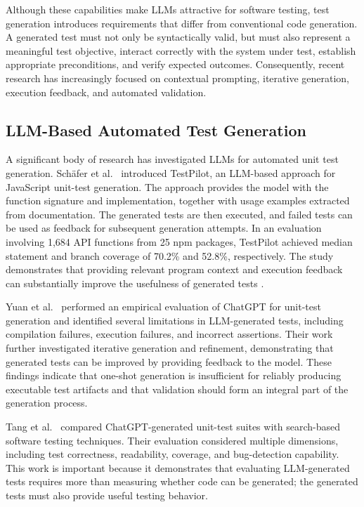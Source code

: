 \documentclass[pdflatex,sn-mathphys-num]{sn-jnl}
\begin{document}
Although these capabilities make LLMs attractive for software testing,
test generation introduces requirements that differ from conventional code
generation. A generated test must not only be syntactically valid, but
must also represent a meaningful test objective, interact correctly with
the system under test, establish appropriate preconditions, and verify
expected outcomes. Consequently, recent research has increasingly focused
on contextual prompting, iterative generation, execution feedback, and
automated validation.

\subsection{LLM-Based Automated Test Generation}
\label{subsec:llm-test-generation}

A significant body of research has investigated LLMs for automated unit
test generation. Schäfer et al.~\cite{schafer2024testpilot} introduced
TestPilot, an LLM-based approach for JavaScript unit-test generation. The
approach provides the model with the function signature and implementation,
together with usage examples extracted from documentation. The generated
tests are then executed, and failed tests can be used as feedback for
subsequent generation attempts. In an evaluation involving 1,684 API
functions from 25 npm packages, TestPilot achieved median statement and
branch coverage of 70.2\% and 52.8\%, respectively. The study demonstrates
that providing relevant program context and execution feedback can
substantially improve the usefulness of generated tests
\cite{schafer2024testpilot}.

Yuan et al.~\cite{yuan2024chatgpt} performed an empirical evaluation of
ChatGPT for unit-test generation and identified several limitations in
LLM-generated tests, including compilation failures, execution failures,
and incorrect assertions. Their work further investigated iterative
generation and refinement, demonstrating that generated tests can be
improved by providing feedback to the model. These findings indicate that
one-shot generation is insufficient for reliably producing executable test
artifacts and that validation should form an integral part of the
generation process.

Tang et al.~\cite{tang2024chatgpt} compared ChatGPT-generated unit-test
suites with search-based software testing techniques. Their evaluation
considered multiple dimensions, including test correctness, readability,
coverage, and bug-detection capability. This work is important because it
demonstrates that evaluating LLM-generated tests requires more than
measuring whether code can be generated; the generated tests must also
provide useful testing behavior.
\end{document}
